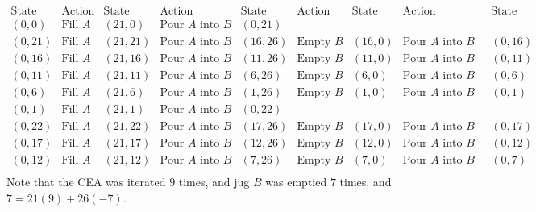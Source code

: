 \documentclass[10pt]{article}
\begin{document}
	$\begin{array}{|c|c|c|c|c|c|c|c|c|} \hline \mbox{State} & \mbox{Action} & \mbox{State} & \mbox{Action} & \mbox{State} & \mbox{Action} &  \mbox{State} & \mbox{Action} & \mbox{State} \\ \hline \hline
		(0,0) & \mbox{Fill $A$} & (21,0) & \mbox{Pour $A$ into $B$} & (0,21)
		& & & &  \\ (0,21) & \mbox{Fill $A$} & (21,21) & \mbox{Pour $A$ into $B$} & (16,26) & \mbox{Empty $B$} & (16,0) & \mbox{Pour $A$ into $B$} & (0,16) \\
		(0,16) & \mbox{Fill $A$} & (21,16) & \mbox{Pour $A$ into $B$} & (11,26) & \mbox{Empty $B$} & (11,0)  & \mbox{Pour $A$ into $B$} & (0,11)\\
		(0,11)& \mbox{Fill $A$} & (21,11) & \mbox{Pour $A$ into $B$} & (6,26) & \mbox{Empty $B$} & (6,0) & \mbox{Pour $A$ into $B$} & (0,6) \\
		(0,6) & \mbox{Fill $A$} & (21,6) & \mbox{Pour $A$ into $B$}& (1,26)  & \mbox{Empty $B$} & (1,0)& \mbox{Pour $A$ into $B$ } & (0,1) \\
		(0,1) & \mbox{Fill $A$} & (21,1) &\mbox{Pour $A$ into $B$} & (0,22) & &&& \\
		(0,22) &\mbox{Fill $A$} & (21,22) & \mbox{Pour $A$ into $B$} & (17,26) & \mbox{Empty $B$} &(17,0)& \mbox{Pour $A$ into $B$} & (0,17) \\
		(0,17)& \mbox{Fill $A$}& (21,17)& \mbox{Pour $A$ into $B$} &(12,26) &\mbox{Empty $B$}& (12,0)& \mbox{Pour $A$ into $B$} & (0,12) \\
		(0,12) & \mbox{Fill $A$} & (21,12) & \mbox{Pour $A$ into $B$} & (7,26)& \mbox{Empty $B$} & (7,0) & \mbox{Pour $A$ into $B$} & (0,7) \\
		
	\end{array}$\\
	
	
	\noindent Note that the CEA was iterated $9$ times, and jug $B$ was emptied $7$ times, and $7 = 21(9) + 26(-7)$. \\
	
	
\end{document}
